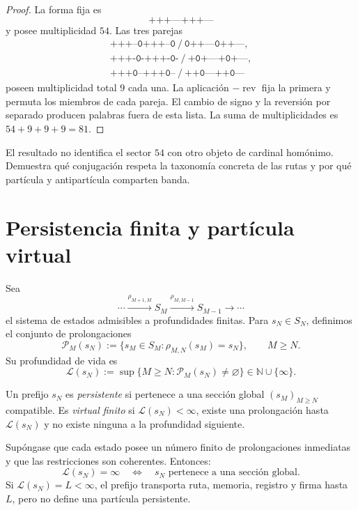 \begin{proof}
La forma fija es
\[
\texttt{+++---+++---}
\]
y posee multiplicidad \(54\). Las tres parejas
\[
\begin{array}{c}
\texttt{+++--0+++--0}\ /\ \texttt{0++---0++---},\\
\texttt{+++-0-+++-0-}\ /\ \texttt{+0+---+0+---},\\
\texttt{+++0--+++0--}\ /\ \texttt{++0---++0---}
\end{array}
\]
poseen multiplicidad total \(9\) cada una. La aplicación
\(-\operatorname{rev}\) fija la primera y permuta los miembros de cada
pareja. El cambio de signo y la reversión por separado producen palabras
fuera de esta lista. La suma de multiplicidades es
\(54+9+9+9=81\).
\end{proof}

El resultado no identifica el sector \(54\) con otro objeto de cardinal
homónimo. Demuestra qué conjugación respeta la taxonomía concreta de las
rutas y por qué partícula y antipartícula comparten banda.

\section{Persistencia finita y partícula virtual}

Sea
\[
\cdots\xrightarrow{\rho_{M+1,M}}S_M
\xrightarrow{\rho_{M,M-1}}S_{M-1}\xrightarrow{}\cdots
\]
el sistema de estados admisibles a profundidades finitas. Para
\(s_N\in S_N\), definimos el conjunto de prolongaciones
\[
\mathcal P_M(s_N)
:=
\{s_M\in S_M:\rho_{M,N}(s_M)=s_N\},
\qquad M\geq N.
\]
Su profundidad de vida es
\[
\mathcal L(s_N)
:=\sup\{M\geq N:\mathcal P_M(s_N)\neq\varnothing\}
\in\mathbb N\cup\{\infty\}.
\]

\begin{definition}
\label{def:persistencia-virtualidad}
Un prefijo \(s_N\) es \emph{persistente} si pertenece a una sección global
\((s_M)_{M\geq N}\) compatible. Es \emph{virtual finito} si
\(\mathcal L(s_N)<\infty\), existe una prolongación hasta
\(\mathcal L(s_N)\) y no existe ninguna a la profundidad siguiente.
\end{definition}

\begin{theorem}
\label{thm:criterio-persistencia-virtual}
Supóngase que cada estado posee un número finito de prolongaciones inmediatas
y que las restricciones son coherentes. Entonces:
\[
\mathcal L(s_N)=\infty
\quad\Longleftrightarrow\quad
s_N\text{ pertenece a una sección global}.
\]
Si \(\mathcal L(s_N)=L<\infty\), el prefijo transporta ruta, memoria,
registro y firma hasta \(L\), pero no define una partícula persistente.
\end{theorem}

